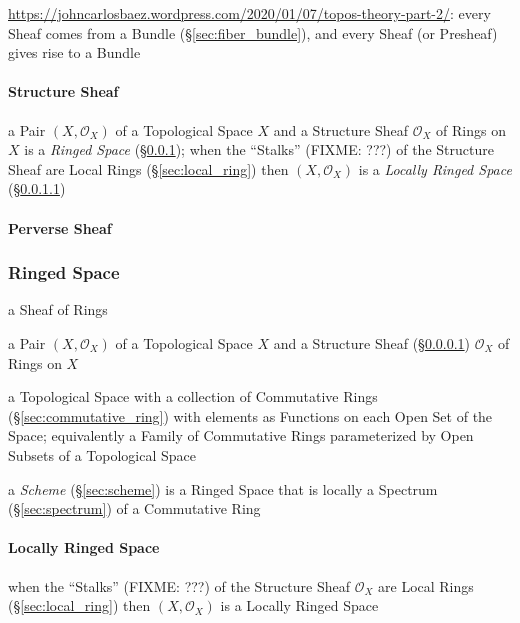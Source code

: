 \url{https://johncarlosbaez.wordpress.com/2020/01/07/topos-theory-part-2/}:
every Sheaf comes from a Bundle (\S\ref{sec:fiber_bundle}), and every Sheaf (or
Presheaf) gives rise to a Bundle



\paragraph{Structure Sheaf}\label{sec:structure_sheaf}\hfill

a Pair $(X,\mathcal{O}_X)$ of a Topological Space $X$ and a Structure Sheaf
$\mathcal{O}_X$ of Rings on $X$ is a \emph{Ringed Space}
(\S\ref{sec:ringed_space});
when the ``Stalks'' (FIXME: ???) of the Structure Sheaf are Local Rings
(\S\ref{sec:local_ring}) then $(X,\mathcal{O}_X)$ is a \emph{Locally Ringed
  Space} (\S\ref{sec:locally_ringed_space})



\paragraph{Perverse Sheaf}\label{sec:perverse_sheaf}\hfill



\subsubsection{Ringed Space}\label{sec:ringed_space}

a Sheaf of Rings

a Pair $(X,\mathcal{O}_X)$ of a Topological Space $X$ and a Structure Sheaf
(\S\ref{sec:structure_sheaf}) $\mathcal{O}_X$ of Rings on $X$

a Topological Space with a collection of Commutative Rings
(\S\ref{sec:commutative_ring}) with elements as Functions on each Open Set of
the Space; equivalently a Family of Commutative Rings parameterized by Open
Subsets of a Topological Space

a \emph{Scheme} (\S\ref{sec:scheme}) is a Ringed Space that is locally a
Spectrum (\S\ref{sec:spectrum}) of a Commutative Ring



\paragraph{Locally Ringed Space}\label{sec:locally_ringed_space}\hfill

when the ``Stalks'' (FIXME: ???) of the Structure Sheaf $\mathcal{O}_X$ are
Local Rings (\S\ref{sec:local_ring}) then $(X,\mathcal{O}_X)$ is a Locally
Ringed Space

